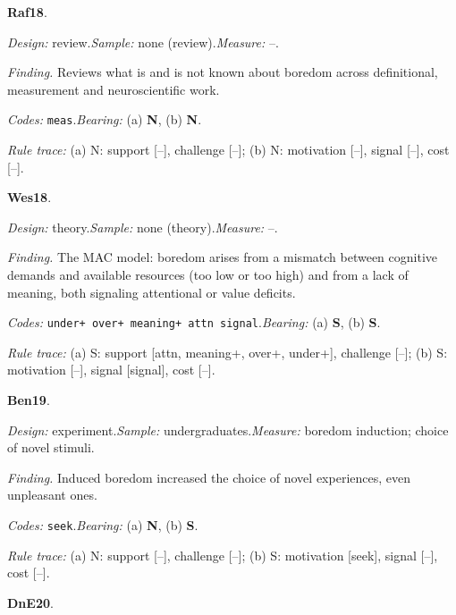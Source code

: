 \medskip
{}
\noindent\textbf{Raf18}\enspace \citet{Raffaelli2018}.\par
{\small\noindent\textit{Design:} review.\quad \textit{Sample:} none (review).\quad \textit{Measure:} --.\par
\noindent\textit{Finding.} Reviews what is and is not known about boredom across definitional, measurement and neuroscientific work.\par
\noindent\textit{Codes:} \texttt{meas}.\quad \textit{Bearing:} (a) \textbf{N}, (b) \textbf{N}.\par
\noindent\textit{Rule trace:} (a) N: support {[}--{]}, challenge {[}--{]}; (b) N: motivation {[}--{]}, signal {[}--{]}, cost {[}--{]}.\par}
\medskip
{}
\noindent\textbf{Wes18}\enspace \citet{WestgateWilson2018}.\par
{\small\noindent\textit{Design:} theory.\quad \textit{Sample:} none (theory).\quad \textit{Measure:} --.\par
\noindent\textit{Finding.} The MAC model: boredom arises from a mismatch between cognitive demands and available resources (too low or too high) and from a lack of meaning, both signaling attentional or value deficits.\par
\noindent\textit{Codes:} \texttt{under+ over+ meaning+ attn signal}.\quad \textit{Bearing:} (a) \textbf{S}, (b) \textbf{S}.\par
\noindent\textit{Rule trace:} (a) S: support {[}attn, meaning+, over+, under+{]}, challenge {[}--{]}; (b) S: motivation {[}--{]}, signal {[}signal{]}, cost {[}--{]}.\par}
\medskip
{}
\noindent\textbf{Ben19}\enspace \citet{BenchLench2019}.\par
{\small\noindent\textit{Design:} experiment.\quad \textit{Sample:} undergraduates.\quad \textit{Measure:} boredom induction; choice of novel stimuli.\par
\noindent\textit{Finding.} Induced boredom increased the choice of novel experiences, even unpleasant ones.\par
\noindent\textit{Codes:} \texttt{seek}.\quad \textit{Bearing:} (a) \textbf{N}, (b) \textbf{S}.\par
\noindent\textit{Rule trace:} (a) N: support {[}--{]}, challenge {[}--{]}; (b) S: motivation {[}seek{]}, signal {[}--{]}, cost {[}--{]}.\par}
\medskip
{}
\noindent\textbf{DnE20}\enspace \citet{DanckertEastwood2020}.\par
